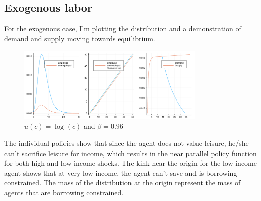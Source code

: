\documentclass{article} %
\begin{document}
\subsection*{Exogenous labor}
For the exogenous case, I'm plotting the distribution and a demonstration of demand and supply moving towards equilibrium.
\begin{figure}[h!]
  \centering
  \includegraphics[width = 0.8\textwidth]{../Inelastic/exosolution.pdf}
    \caption{$u(c)=\log(c)$ and $\beta = 0.96$}
  \end{figure}
  The individual policies show that since the agent does not value leisure, he/she can't sacrifice leisure for income, which results in the near parallel policy function for both high and low income shocks. The kink near the origin for the low income agent shows that at very low income, the agent can't save and is borrowing constrained. The mass of the distribution at the origin represent the mass of agents that are borrowing constrained. 
\end{document}
